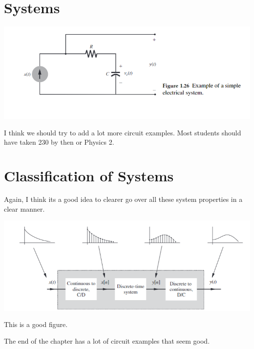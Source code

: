 \section{Systems}
\begin{example}
    \begin{center}
        \includegraphics{images/circuits_as_system.png}
    \end{center}
    I think we should try to add a lot more circuit examples. Most students should have taken 230 by then or Physics 2.
\end{example}

\section{Classification of Systems}
Again, I think its a good idea to clearer go over all these system properties in a clear manner.

\begin{center}
    \includegraphics{images/difference_of_discrete_cont.png}
\end{center}
This is a good figure.

The end of the chapter has a lot of circuit examples that seem good.
